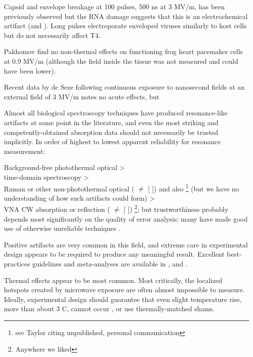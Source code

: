 \documentclass[paper.tex]{subfiles}
\begin{document}
Capsid and envelope breakage at 100 pulses, 500 ns at 3 MV/m, has been previously observed\cite{Inactivation1990} but the RNA damage suggests that this is an electrochemical artifact \cite{Formation1996} (and \cite{Microwave1987}). Long pulses electroporate enveloped viruses similarly to host cells\cite{AC2017} but do not necessarily affect T4\cite{Manipulation2013}. 

Pakhomov \cite{Comparative} find no non-thermal effects on functioning frog heart pacemaker cells at 0.9 MV/m (although the field inside the tissue was not measured and could have been lower). 

Recent data by de Seze following continuous exposure to nanosecond fields at an external field of 3 MV/m \cite{Repeated2020} notes no acute effects, but 

Almost all biological spectroscopy techniques have produced resonance-like artifacts at some point in the literature, and even the most striking and competently-obtained absorption data should not necessarily be trusted implicitly. In order of highest to lowest apparent reliability for resonance measurement:

Background-free photothermal optical \cite{Microwave1993a}\cite{Broadband1988} >\\ time-domain spectroscopy\cite{Time2003}\cite{Dielectric2004}\cite{Microwave1994} >\\ Raman or other non-photothermal optical (\cite{optical1983} $\neq$ [\cite{Resonances1987} \cite{Dielectric1989}]) and also \footnote{see Taylor \cite{mechanisms1981} citing unpublished, personal communication} (but we have no understanding of how such artifacts could form) >\\ VNA CW absorption or reflection ( \cite{Microwave1982} $\neq$ [\cite{Resonances1987} \cite{Dielectric1989}]) \footnote{Anywhere we liked}; but trustworthiness probably depends most significantly on the quality of error analysis; many have made good use of otherwise unreliable techniques \cite{Substitution1982} \cite{Millimeter1980}.

Positive artifacts are very common in this field, and extreme care in experimental design appears to be required to produce any meaningful result. Excellent best-practices guidelines and meta-analyses are available in \cite{Biological2016} \cite{Comprehensive2018} \cite{Funding2019}, \cite{chou1996radio} and \cite{Effects2016}.

Thermal effects appear to be most common. Most critically, the localized hotspots created by microwave exposure are often almost impossible to measure. Ideally, experimental design should guarantee that even slight temperature rise, more than about 3 C, cannot occur \cite{DNA2004}, or use thermally-matched shams. 
\end{document}
